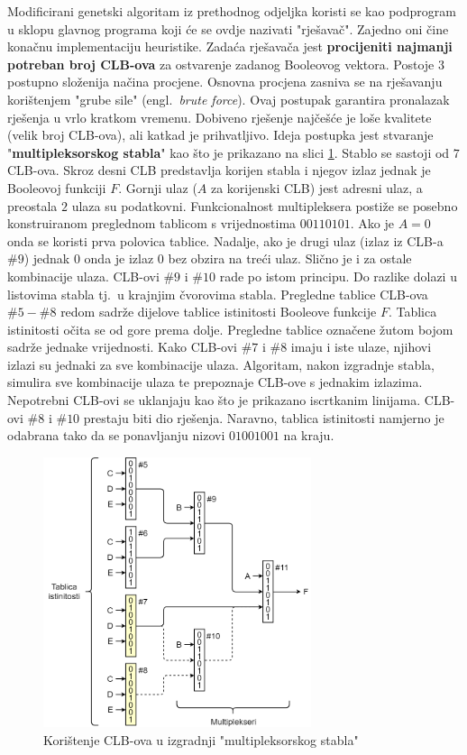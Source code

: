 \documentclass[times, utf8, diplomski]{fer}
\begin{document}
Modificirani genetski algoritam iz prethodnog odjeljka koristi se kao podprogram u sklopu glavnog programa koji će se ovdje nazivati "rješavač". Zajedno oni čine konačnu implementaciju heuristike. Zadaća rješavača jest \textbf{procijeniti najmanji potreban broj CLB-ova} za ostvarenje zadanog Booleovog vektora. Postoje $3$ postupno složenija načina procjene. Osnovna procjena zasniva se na rješavanju korištenjem "grube sile" (engl.~\textit{brute force}). Ovaj postupak garantira pronalazak rješenja u vrlo kratkom vremenu. Dobiveno rješenje najčešće je loše kvalitete (velik broj CLB-ova), ali katkad je prihvatljivo. Ideja postupka jest stvaranje "\textbf{multipleksorskog stabla}" kao što je prikazano na slici \ref{fig:brute}. Stablo se sastoji od $7$ CLB-ova. Skroz desni CLB predstavlja korijen stabla i njegov izlaz jednak je Booleovoj funkciji $F$. Gornji ulaz ($A$ za korijenski CLB) jest adresni ulaz, a preostala $2$ ulaza su podatkovni. Funkcionalnost multipleksera postiže se posebno konstruiranom preglednom tablicom s vrijednostima $00110101$. Ako je $A=0$ onda se koristi prva polovica tablice. Nadalje, ako je drugi ulaz (izlaz iz CLB-a $\#9$) jednak $0$ onda je izlaz $0$ bez obzira na treći ulaz. Slično je i za ostale kombinacije ulaza. CLB-ovi $\#9$ i $\#10$ rade po istom principu. Do razlike dolazi u listovima stabla tj.~u krajnjim čvorovima stabla. Pregledne tablice CLB-ova $\#5-\#8$ redom sadrže dijelove tablice istinitosti Booleove funkcije $F$. Tablica istinitosti očita se od gore prema dolje. Pregledne tablice označene žutom bojom sadrže jednake vrijednosti. Kako CLB-ovi $\#7$ i $\#8$ imaju i iste ulaze, njihovi izlazi su jednaki za sve kombinacije ulaza. Algoritam, nakon izgradnje stabla, simulira sve kombinacije ulaza te prepoznaje CLB-ove s jednakim izlazima. Nepotrebni CLB-ovi se uklanjaju kao što je prikazano iscrtkanim linijama. CLB-ovi $\#8$ i $\#10$ prestaju biti dio rješenja. Naravno, tablica istinitosti namjerno je odabrana tako da se ponavljanju nizovi $01001001$ na kraju.

\begin{figure}[htb]
	\centering
	\includegraphics[width=0.7\textwidth]{img/brute.png}
	\caption{Korištenje CLB-ova u izgradnji "multipleksorskog stabla"}
	\label{fig:brute}
\end{figure}
\end{document}
